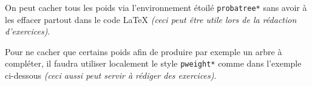 \documentclass[12pt,a4paper]{article}
\begin{document}





On peut cacher tous les poids via l'environnement étoilé \verb+probatree*+ sans avoir à les effacer partout dans le code \LaTeX{} \emph{(ceci peut être utile lors de la rédaction d'exercices)}.






Pour ne cacher que certains poids afin de produire par exemple un arbre à compléter, il faudra utiliser localement le style \verb+pweight*+ comme dans l'exemple ci-dessous \emph{(ceci aussi peut servir à rédiger des exercices)}.



%
%
%
%
%
\end{document}
